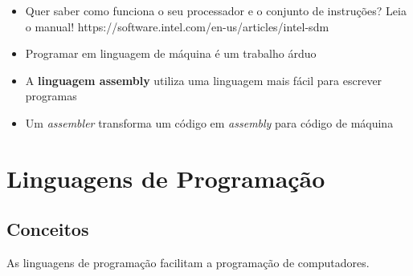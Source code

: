 \documentclass[portuguese,10pt,xcolor=table]{bredelebeamer}
\begin{document}
	\begin{frame}
\begin{itemize}
\item Quer saber como funciona o seu processador e o conjunto de instruções? Leia o manual! https://software.intel.com/en-us/articles/intel-sdm
\item Programar em linguagem de máquina é um trabalho árduo
\item A \textbf{linguagem assembly} utiliza uma linguagem mais fácil para escrever programas
\item Um \textit{assembler} transforma um código em \textit{assembly} para código de máquina
\end{itemize}
	\end{frame}

\section{Linguagens de Programação}
	\begin{frame}
		\begin{center}
			\structure{\Huge \insertsection}
		\end{center}
	\end{frame} 

	\subsection{Conceitos}
	\begin{frame}
	\footnotesize
	As \colorbox{blue!30}{linguagens de programação} facilitam a programação de computadores. \\

	\end{frame}

\end{document}

